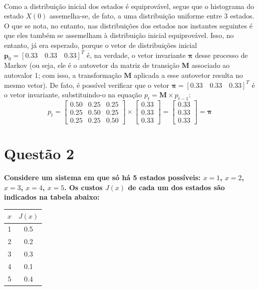 \documentclass{report}
\begin{document}
\paragraph{} Como a distribuição inicial dos estados é equiprovável, segue que o histograma do estado $X(0)$ assemelha-se, de fato, a uma distribuição uniforme entre 3 estados. O que se nota, no entanto, nas distribuições dos estados nos instantes seguintes é que eles também se assemelham à distribuição inicial equiprovável. Isso, no entanto, já era esperado, porque o vetor de distribuições inicial $\mathbf{p}_0 = [0.33 \quad 0.33 \quad 0.33]^T$ é, na verdade, o vetor invariante $\boldsymbol{\pi}$ desse processo de Markov (ou seja, ele é o autovetor da matriz de transição $\mathbf{M}$ associado ao autovalor 1; com isso, a transformação $\mathbf{M}$ aplicada a esse autovetor resulta no mesmo vetor). De fato, é possível verificar que o vetor $\boldsymbol{\pi} = [0.33 \quad 0.33 \quad 0.33]^T$ é o vetor invariante, substituindo-o na equação $p_t = \mathbf{M} \times p_{t-1}$:\\

\begin{equation*}
p_t = \left[ \begin{array}{ccc}
0.50 & 0.25 & 0.25 \\ 
0.25 & 0.50 & 0.25 \\ 
0.25 & 0.25 & 0.50 
\end{array} \right] \times \left[\begin{array}{c}
0.33 \\ 
0.33 \\ 
0.33
\end{array} \right] = \left[ \begin{array}{c}
0.33 \\ 
0.33 \\ 
0.33
\end{array}  \right] = \boldsymbol{\pi}
\end{equation*}

\section*{Questão 2}

\textbf{Considere um sistema em que só há 5 estados possíveis: $x = 1$, $x = 2$, $x = 3$, $x = 4$, $x = 5$. Os custos $J(x)$ de cada um dos estados são indicados na tabela abaixo:}\\

\begin{table}[H]
	\centering
	\begin{tabular}{c|c}
	$x$ & $J(x)$ \\ 
	\hline 
	1 & 0.5 \\ 
	\hline 
	2 & 0.2 \\ 
	\hline 
	3 & 0.3 \\ 
	\hline 
	4 & 0.1 \\ 
	\hline 
	5 & 0.4 \\ 
\end{tabular}
\end{table}
\end{document}
